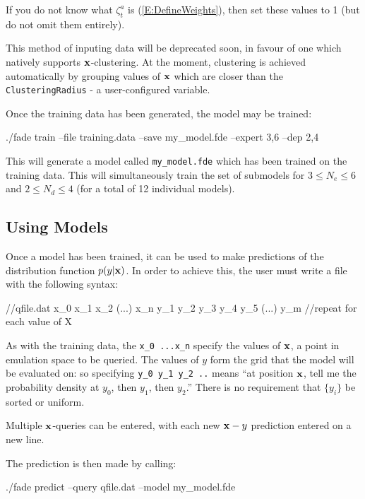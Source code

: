 	If you do not know what $\zeta_t^a$ is (\ref{E:DefineWeights}), then set these values to 1 (but do not omit them entirely).

	\begin{aside}
		This method of inputing data will be deprecated soon, in favour of one which natively supports $\mathbf{\boldsymbol{\mathrm{x}}}$-clustering. At the moment, clustering is achieved automatically by grouping values of $\mathbf{\boldsymbol{\mathrm{x}}}$ which are closer than the \texttt{ClusteringRadius} - a user-configured variable.
	\end{aside}

	Once the training data has been generated, the model may be trained:

	\begin{terminal}
		./fade train --file training.data --save my_model.fde --expert 3,6 --dep 2,4
	\end{terminal}

	This will generate a model called \texttt{my\_model.fde} which has been trained on the training data. This will simultaneously train the set of submodels for $3 \leq N_e \leq 6$ and $2 \leq N_d \leq 4$ (for a total of 12 individual models).
\subsection{Using Models}

	Once a model has been trained, it can be used to make predictions of the distribution function $p(y| \mathbf{\boldsymbol{\mathrm{x}}})$. In order to achieve this, the user must write a file with the following syntax:

	\begin{terminal}
//qfile.dat
x_0 x_1 x_2 (...) x_n y_1 y_2 y_3 y_4 y_5 (...) y_m
//repeat for each value of X
\end{terminal}

	As with the training data, the \texttt{x\_0 ...x\_n} specify the values of $\mathbf{\boldsymbol{\mathrm{x}}}$, a point in emulation space to be queried. The values of $y$ form the grid that the model will be evaluated on: so specifying \texttt{y\_0 y\_1 y\_2 ..} means ``at position $\mathbf{\boldsymbol{\mathrm{x}}}$, tell me the probability density at $y_0$, then $y_1$, then $y_2$.'' There is no requirement that $\{y_i\}$ be sorted or uniform.

	Multiple $\mathbf{\boldsymbol{\mathrm{x}}}$-queries can be entered, with each new $\mathbf{\boldsymbol{\mathrm{x}}}-y$ prediction entered on a new line.

	The prediction is then made by calling:

	\begin{terminal}
./fade predict --query qfile.dat --model my_model.fde
	\end{terminal}

